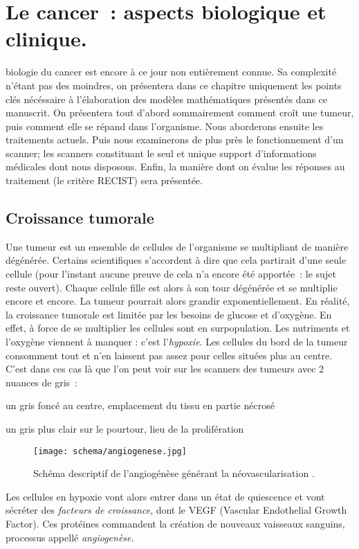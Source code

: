 \documentclass[main.tex]{subfiles}
\begin{document}
\chapter{Le cancer~: aspects biologique et clinique.}
 biologie du cancer est encore à ce jour non entièrement connue. Sa complexité n'étant pas des moindres, on présentera dans ce chapitre uniquement les points clés nécéssaire à l'élaboration des modèles mathématiques présentés dans ce manuscrit. On présentera tout d'abord sommairement comment croît une tumeur, puis comment elle se répand dans l'organisme. Nous aborderons ensuite les traitements actuels. Puis nous examinerons de plus près le fonctionnement d'un scanner; les scanners constituant le seul et unique support d'informations médicales dont nous disposons. Enfin, la manière dont on évalue les réponses au traitement (le critère RECIST) sera présentée.

\section{Croissance tumorale}
Une tumeur est un ensemble de cellules de l'organisme se multipliant de manière dégénérée. Certains scientifiques s'accordent à dire que cela partirait d'une seule cellule (pour l'instant aucune preuve de cela n'a encore été apportée~: le sujet reste ouvert). Chaque cellule fille est alors à son tour dégénérée et se multiplie encore et encore. La tumeur pourrait alors grandir exponentiellement. En réalité, la croissance tumorale est limitée par les besoins de glucose et d'oxygène. En effet, à force de se multiplier les cellules sont en surpopulation. Les nutriments et l'oxygène viennent à manquer : c'est l'\emph{hypoxie}. Les cellules du bord de la tumeur consomment tout et n'en laissent pas assez pour celles situées plus au centre. C'est dans ces cas là que l'on peut voir sur les scanners des tumeurs avec 2 nuances de gris~:
\begin{myitemize}
\item un gris foncé au centre, emplacement du tissu en partie nécrosé
\item un gris plus clair sur le pourtour, lieu de la prolifération
\end{myitemize}
\begin{wrapfigure}[18]{R}{.5\textwidth}
\texttt{[image: schema/angiogenese.jpg]}
\caption{\label{fig:schema_angio} Schéma descriptif de l'angiogénèse générant la néovascularisation \cite{web1}.}
\end{wrapfigure}
Les cellules en hypoxie vont alors entrer dans un état de quiescence et vont sécréter des \emph{facteurs de croissance}, dont le VEGF (Vascular Endothelial Growth Factor). Ces protéïnes commandent la création de nouveaux vaisseaux sanguins, processus appellé \emph{angiogenèse}. 
\end{document}
